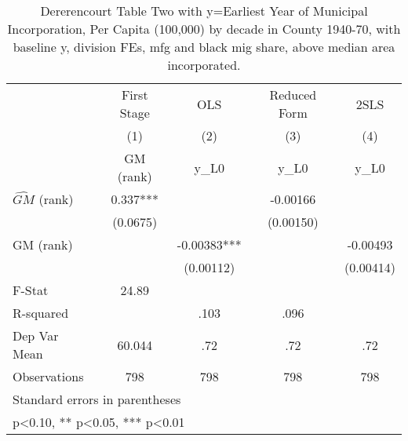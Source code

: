 \begin{table}[htbp]\centering
\def\sym#1{\ifmmode^{#1}\else\(^{#1}\)\fi}
\caption{Dererencourt Table Two with y=Earliest Year of Municipal Incorporation, Per Capita (100,000) by decade in County 1940-70, with baseline y, division FEs, mfg and black mig share, above median area incorporated.}
\begin{tabular}{l*{4}{c}}
\toprule
                    & First Stage   &         OLS   &Reduced Form   &        2SLS   \\
                    &\multicolumn{1}{c}{(1)}&\multicolumn{1}{c}{(2)}&\multicolumn{1}{c}{(3)}&\multicolumn{1}{c}{(4)}\\
                    &\multicolumn{1}{c}{GM  (rank)}&\multicolumn{1}{c}{y\_L0}&\multicolumn{1}{c}{y\_L0}&\multicolumn{1}{c}{y\_L0}\\
\midrule
$\hat{GM}$ (rank)   &       0.337***&               &    -0.00166   &               \\
                    &    (0.0675)   &               &   (0.00150)   &               \\
\addlinespace
GM  (rank)          &               &    -0.00383***&               &    -0.00493   \\
                    &               &   (0.00112)   &               &   (0.00414)   \\
\midrule
F-Stat              &       24.89   &               &               &               \\
R-squared           &               &        .103   &        .096   &               \\
Dep Var Mean        &      60.044   &         .72   &         .72   &         .72   \\
Observations        &         798   &         798   &         798   &         798   \\
\bottomrule
\multicolumn{5}{l}{\footnotesize Standard errors in parentheses}\\
\multicolumn{5}{l}{\footnotesize * p<0.10, ** p<0.05, *** p<0.01}\\
\end{tabular}
\end{table}
